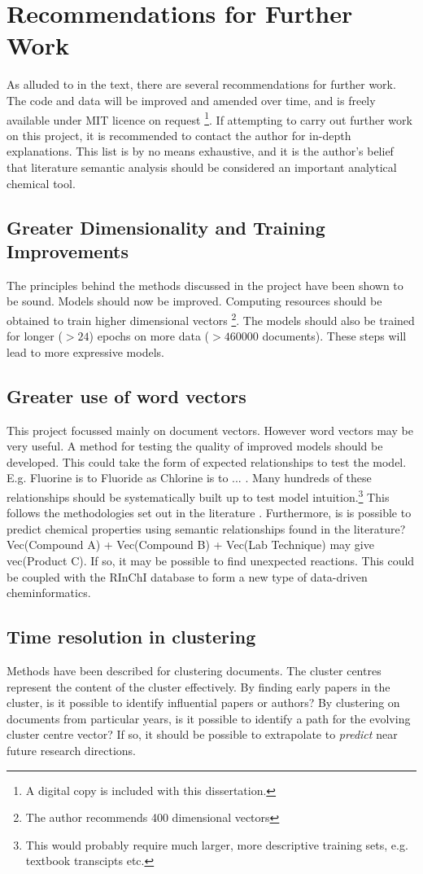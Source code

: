 \chapter{Recommendations for Further Work}
\label{chapt:RECOMMENDATIONS}
As alluded to in the text, there are several recommendations for further work. The code and data will be improved and amended over time, and is freely available under MIT licence on request \footnote{A digital copy is included with this dissertation.}. If attempting to carry out further work on this project, it is recommended to contact the author for in-depth explanations. This list is by no means exhaustive, and it is the author's belief that literature semantic analysis should be considered an important analytical chemical tool.
\section{Greater Dimensionality and Training Improvements}
The principles behind the methods discussed in the project have been shown to be sound. Models should now be improved. Computing resources should be obtained to train higher dimensional vectors \footnote{ The author recommends 400 dimensional vectors}. The models should also be trained for longer ($\gt 24$) epochs on more data ($\gt 460000$ documents). These steps will lead to more expressive models.
\section{Greater use of word vectors}
This project focussed mainly on document vectors. However word vectors may be very useful. A method for testing the quality of improved models should be developed. This could take the form of expected relationships to test the model. E.g. Fluorine is to Fluoride as Chlorine is to ... . Many hundreds of these relationships should be systematically built up to test model intuition.\footnote{This would probably require much larger, more descriptive training sets, e.g. textbook transcipts etc.} This follows the methodologies set out in the literature \cite{word2vec1} \cite{word2vec2}. Furthermore, is is possible to predict chemical properties using semantic relationships found in the literature? Vec(Compound A) + Vec(Compound B) + Vec(Lab Technique) may give vec(Product C). If so, it may be possible to find unexpected reactions. This could be coupled with the RInChI database to form a new type of data-driven cheminformatics.
\section{Time resolution in clustering}
Methods have been described for clustering documents. The cluster centres represent the content of the cluster effectively. By finding early papers in the cluster, is it possible to identify influential papers or authors?
By clustering on documents from particular years, is it possible to identify a path for the evolving cluster centre vector? If so, it should be possible to extrapolate to \emph{predict} near future research directions.

